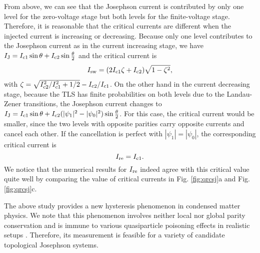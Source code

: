 \documentclass[aps,prl,twocolumn,showpacs,showpacs,10pt,superscriptaddress]{revtex4-1}
\begin{document}
From above, we can see that the Josephson current is contributed by only one level for the zero-voltage stage but both levels for the finite-voltage stage. Therefore, it is reasonable that the critical currents are different when the injected current is increasing or decreasing. Because only one level contributes to the Josephson current as in the current increasing stage, we have $I_{\rm J}=I_{\rm c1}\sin{\theta}+I_{\rm c2}\sin{\frac{\theta}{2}}$ and the critical current is
\begin{eqnarray}\label{eq:Isw}
I_{\rm sw} = (2I_{\rm c1}  \zeta  + I_{\rm c2}   ) \sqrt{1- \zeta^2},
\end{eqnarray}
with $\zeta =\sqrt{I_{\rm c2}^2/I_{\rm c1}^2 + {1}/{2}} - I_{\rm c2}/I_{\rm c1}$.
On the other hand in the current decreasing stage, because the TLS has finite probabilities on both levels due to the Landau-Zener transitions, the Josephson current changes to $I_{\rm J}=I_{\rm c1}\sin{\theta}+I_{\rm c2}(|\psi_1|^2 - |\psi_0|^2)\sin{\frac{\theta}{2}}$. For this case, the critical current would be smaller, since the two levels with opposite parities carry opposite currents and cancel each other. If the cancellation is perfect with $|\psi_1| = |\psi_0|$, the corresponding critical current is
\begin{equation}\label{eq:Ire}
I_{\rm re} = I_{\rm c1}.
\end{equation}
We notice that the numerical results for $I_{\rm re}$ indeed agree with this critical value quite well by comparing the value of critical currents in Fig. \ref{fig:qrcsj}a and Fig. \ref{fig:qrcsj}c.


The above study provides a new hysteresis phenomenon in condensed matter physics. We note that this phenomenon involves neither local nor global parity conservation and is immune to various quasiparticle poisoning effects in realistic setups \cite{supplement,yangpeng}. Therefore, its measurement is feasible for a variety of candidate topological Josephson systems.
\end{document}
